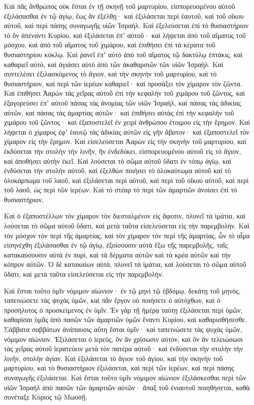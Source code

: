 {Καὶ πᾶς ἄνθρώπος οὐκ ἔσται ἐν τῇ σκηνῇ τοῦ μαρτυρίου, εἰσπορευομένου αὐτοῦ ἐξιλάσασθαι ἐν τῷ ἁγίῳ, ἕως ἂν ἐξέλθῃ· καὶ ἐξιλάσεται περὶ ἑαυτοῦ, καὶ τοῦ οἴκου αὐτοῦ, καὶ περὶ πάσης συναγωγῆς υἱῶν Ἰσραήλ.
Καὶ ἐξελεύσεται ἐπὶ τὸ θυσιαστήριον τὸ ὂν ἀπέναντι Κυρίου, καὶ ἐξιλάσεται ἐπʼ αὐτοῦ· καὶ λήψεται ἀπὸ τοῦ αἵματος τοῦ μόσχου, καὶ ἀπὸ τοῦ αἵματος τοῦ χιμάρου, καὶ ἐπιθήσει ἐπὶ τὰ κέρατα τοῦ θυσιαστηρίου κύκλῳ.
Καὶ ῥανεῖ ἐπʼ αὐτὸ ἀπὸ τοῦ αἵματος τῷ δακτύλῳ ἑπτάκις, καὶ καθαριεῖ αὐτό, καὶ ἁγιάσει αὐτὸ ἀπὸ τῶν ἀκαθαρσιῶν τῶν υἱῶν Ἰσραήλ.
Καὶ συντελέσει ἐξιλασκόμενος τὸ ἅγιον, καὶ τὴν σκηνὴν τοῦ μαρτυρίου, καὶ τὸ θυσιαστήριον, καὶ περὶ τῶν ἱερέων καθαριεῖ· καὶ προσάξει τὸν χίμαρον τὸν ζῶντα.
Καὶ ἐπιθήσει Ἀαρὼν τὰς χεῖρας αὐτοῦ ἐπὶ τὴν κεφαλὴν τοῦ χιμάρου τοῦ ζῶντος, καὶ ἐξαγορεύσει ἐπʼ αὐτοῦ πάσας τὰς ἀνομίας τῶν υἱῶν Ἰσραὴλ, καὶ πάσας τὰς ἀδικίας αὐτῶν, καὶ πάσας τὰς ἁμαρτίας αὐτῶν· καὶ ἐπιθήσει αὐτὰς ἐπὶ τὴν κεφαλὴν τοῦ χιμάρου τοῦ ζῶντος· καὶ ἐξαποστελεῖ ἐν χειρὶ ἀνθρώπου ἑτοιμου εἰς τὴν ἔρημον.
Καὶ λήψεται ὁ χίμαρος ἐφʼ ἑαυτῷ τὰς ἀδικίας αὐτῶν εἰς γῆν ἄβατον· καὶ ἐξαποστελεῖ τὸν χίμαρον εἰς τὴν ἔρημον.
Καὶ εἰσελεύσεται Ἀαρὼν εἰς τὴν σκηνὴν τοῦ μαρτυρίου, καὶ ἐκδύσεται τὴν στολὴν τὴν λινῆν, ἣν ἐνδεδύκει, εἰσπορευομένου αὐτοῦ εἰς τὸ ἅγιον, καὶ ἀποθήσει αὐτὴν ἐκεῖ.
Καὶ λούσεται τὸ σῶμα αὐτοῦ ὕδατι ἐν τόπῳ ἁγίῳ, καὶ ἐνδύσεται τὴν στολὴν αὐτοῦ, καὶ ἐξελθὼν ποιήσει τὸ ὁλοκαύτωμα αὐτοῦ καὶ τὸ ὁλοκάρπωμα τοῦ λαοῦ, καὶ ἐξιλάσεται περὶ αὐτοῦ, καὶ περὶ τοῦ οἴκου αὐτοῦ, καὶ περὶ τοῦ λαοῦ, ὡς περὶ τῶν ἱερέων.
Καὶ τὸ στέαρ τὸ περὶ τῶν ἁμαρτιῶν ἀνοίσει ἐπὶ τὸ θυσιαστήριον.
\par }{\PP {}Καὶ ὁ ἐξαποστέλλων τὸν χίμαρον τὸν διεσταλμένον εἰς ἄφεσιν, πλυνεῖ τὰ ἱμάτια, καὶ λούσεται τὸ σῶμα αὐτοῦ ὕδατι, καὶ μετὰ ταῦτα εἰσελεύσεται εἰς τὴν παρεμβολήν.
Καὶ τὸν μόσχον τὸν περὶ τῆς ἁμαρτίας, καὶ τὸν χίμαρον τὸν περὶ τῆς ἁμαρτίας, ὧν τὸ αἷμα εἰσηνέχθη ἐξιλάσασθαι ἐν τῷ ἁγίῳ, ἐξοίσουσιν αὐτὰ ἔξω τῆς παρεμβολῆς, ταῖς κατακαύσουσιν αὐτὰ ἐν πυρὶ, καὶ τὰ δέρματα αὐτῶν καὶ τὰ κρέα αὐτῶν καὶ τὴν κόπρον αὐτῶν.
Ὁ δὲ κατακαίων αὐτὰ, πλυνεῖ τὰ ἱμάτια, καὶ λούσεται τὸ σῶμα αὐτοῦ ὕδατι, καὶ μετὰ ταῦτα εἰσελεύσεται εἰς τὴν παρεμβολήν.
\par }{\PP {}Καὶ ἔσται τοῦτο ὑμῖν νόμιμον αἰώνιον· ἐν τῷ μηνὶ τῷ ἑβδόμῳ, δεκάτῃ τοῦ μηνὸς, ταπεινώσετε τὰς ψυχὰς ὑμῶν, καὶ πᾶν ἔργον οὐ ποιήσετε ὁ αὐτόχθων, καὶ ὁ προσήλυτος ὁ προσκείμενος ἐν ὑμῖν.
Ἐν γὰρ τῇ ἡμέρᾳ ταύτῃ ἐξιλάσεται περὶ ὑμῶν, καθαρίσαι ὑμᾶς ἀπὸ πασῶν τῶν ἁμαρτιῶν ὑμῶν ἔναντι Κυρίου, καὶ καθαρισθήσεσθε.
Σάββατα σαββάτων ἀνάπαυσις αὕτη ἔσται ὑμῖν· καὶ ταπεινώσετε τὰς ψυχὰς ὑμῶν, νόμιμον αἰώνιον.
Ἐξιλάσεται ὁ ἱερεὺς, ὃν ἂν χρίσωσιν αὐτὸν, καὶ ὃν ἂν τελειώσωσι τὰς χεῖρας αὐτοῦ ἱερατεύειν μετὰ τὸν πατέρα αὐτοῦ· καὶ ἐνδύσεται τὴν στολὴν τὴν λινῆν, στολὴν ἁγίαν.
Καὶ ἐξιλάσεται τὸ ἅγιον τοῦ ἁγίου, καὶ τὴν σκηνὴν τοῦ μαρτυρίου, καὶ τὸ θυσιαστήριον ἐξιλάσεται, καὶ περὶ τῶν ἱερέων, καὶ περὶ πάσης συναγωγῆς ἐξιλάσεται.
Καὶ ἔσται τοῦτο ὑμῖν νόμιμον αἰώνιον ἐξιλάσκεσθαι περὶ τῶν υἱῶν Ἰσραὴλ ἀπὸ πασῶν τῶν ἁμαρτιῶν αὐτῶν· ἅπαξ τοῦ ἐνιαυτοῦ ποιηθήσεται, καθὰ συνέταξε Κύριος τῷ Μωυσῇ.

}
